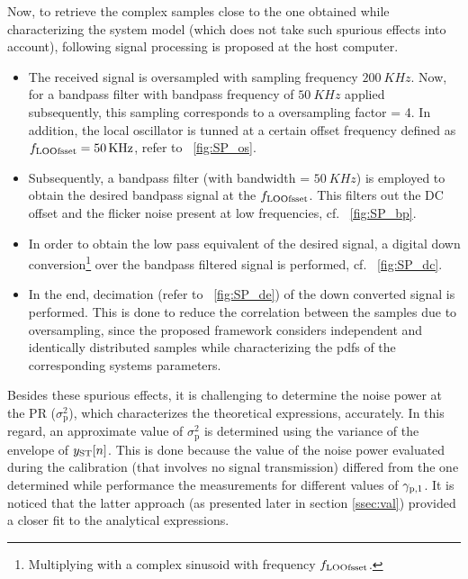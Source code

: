 Now, to retrieve the complex samples close to the one obtained while characterizing the system model (which does not take such spurious effects into account), following signal processing is proposed at the host computer.\begin{itemize}
\item The received signal is oversampled with sampling frequency $\SI{200}{KHz}$. Now, for a bandpass filter with bandpass frequency of $\SI{50}{KHz}$ applied subsequently, this sampling corresponds to a oversampling factor = 4. In addition, the local oscillator is tunned at a certain offset frequency defined as $f_{\text{LOOfsset}} = \SI{50}{KHz}$, refer to \figurename~\ref{fig:SP_os}. 
\item Subsequently, a bandpass filter (with bandwidth = $\SI{50}{KHz}$) is employed to obtain the desired bandpass signal at the $f_{\text{LOOfsset}}$. This filters out the DC offset and the flicker noise present at low frequencies, cf. \figurename~\ref{fig:SP_bp}. 
\item In order to obtain the low pass equivalent of the desired signal, a digital down conversion\footnote{Multiplying with a complex sinusoid with frequency $f_{\text{LOOfsset}}$.} over the bandpass filtered signal is performed, cf. \figurename~\ref{fig:SP_dc}. %
\item In the end, decimation (refer to \figurename~\ref{fig:SP_de}) of the down converted signal is performed. This is done to reduce the correlation between the samples due to oversampling, since the proposed framework considers independent and identically distributed samples while characterizing the pdfs of the corresponding systems parameters. 
\end{itemize}

Besides these spurious effects, it is challenging to determine the noise power at the PR ($\sigma_\textrm{p}^2$), which characterizes the theoretical expressions, accurately. In this regard, an approximate value of $\sigma_\textrm{p}^2$ is determined using the variance of the envelope of $y_{\text{ST}}[n]$. This is done because the value of the noise power evaluated during the calibration (that involves no signal transmission) differed from the one determined while performance the measurements for different values of ${\gamma}_{\text{p,1}}$. It is noticed that the latter approach (as presented later in section \ref{ssec:val}) provided a closer fit to the analytical expressions.

